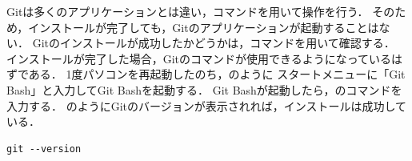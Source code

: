 Gitは多くのアプリケーションとは違い，コマンドを用いて操作を行う．
そのため，インストールが完了しても，Gitのアプリケーションが起動することはない．
Gitのインストールが成功したかどうかは，コマンドを用いて確認する．
インストールが完了した場合，Gitのコマンドが使用できるようになっているはずである．
1度パソコンを再起動したのち，のように
スタートメニューに「Git Bash」と入力してGit Bashを起動する．
Git Bashが起動したら，のコマンドを入力する．
のようにGitのバージョンが表示されれば，インストールは成功している．
\\
\begin{lstlisting}[caption=Gitのバージョン確認コマンド, label=lst:git_version]
  git --version
\end{lstlisting}

